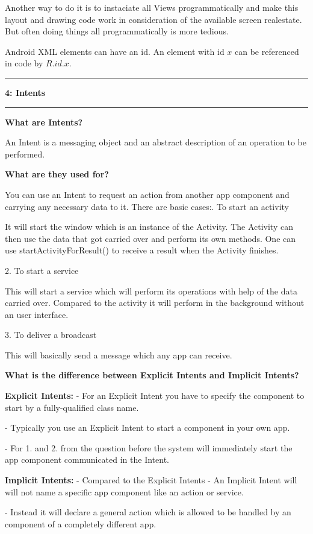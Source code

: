 \documentclass[11pt]{article}
\newcommand\question[2]{\vspace{.25in}\hrule\textbf{#1: #2}\vspace{.5em}\hrule\vspace{.10in}}
\begin{document}
Another way to do it is to instaciate all Views programmatically and make this layout and drawing code work in consideration of the available screen realestate. But often doing things all programmatically is more tedious.

Android XML elements can have an id. An element with id $x$ can be referenced in code by $R.id.x$.

\question{4}{Intents} 

\textbf {What are Intents?}

An Intent is a messaging object and an abstract description of an operation to be performed.

\textbf{What are they used for? }

You can use an Intent to request an action from another app component and carrying any necessary data to it.
There are basic cases:. To start an activity
	
It will start the window which is an instance of the Activity. 
The Activity can then use the data that got carried over and perform its own methods.
One can use startActivityForResult() to receive a result when the Activity finishes.
 
2. To start a service

This will start a service which will perform its operations with help of the data carried over.
Compared to the activity it will perform in the background without an user interface.

3. To deliver a broadcast

This will basically send a message which any app can receive.

\textbf {What is the difference between Explicit Intents and Implicit Intents?}

\textbf{Explicit Intents:}\newline
- For an Explicit Intent you have to specify the component to start by a fully-qualified class name.

- Typically you use an Explicit Intent to start a component in your own app.

- For 1. and 2. from the question before the system will immediately start the app component communicated in the Intent.

\textbf{Implicit Intents:}\newline
- Compared to the Explicit Intents - An Implicit Intent will will not name a specific app component like an action or service.

- Instead it will declare a general action which is allowed to be handled by an component of    a completely different app. 	
\end{document}
